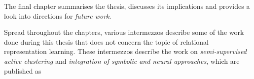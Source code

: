 \begin{quote}
\end{quote}


The final chapter summarises the thesis, discusses its implications and provides a look into directions for \textit{future work}.

Spread throughout the chapters, various intermezzos describe some of the work done during this thesis that does not concern the topic of relational representation learning.
These intermezzos describe the work on \textit{semi-supervised active clustering} and \textit{integration of symbolic and neural approaches}, which are published as

\begin{quote}
\end{quote}

\begin{quote}
\end{quote}

\begin{quote}
\end{quote}

\begin{quote}
\end{quote}






\cleardoublepage

